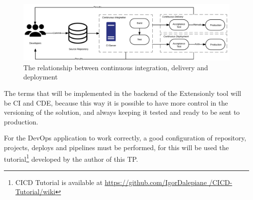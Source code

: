 \begin{figure}[htb]
  \caption{The relationship between continuous integration, delivery and deployment}\label{fig:relationship-ci-cde-cd}
  \begin{center}
    \includegraphics[width=15cm]{img/6-ci-cde-structure.png}
  \end{center}
\end{figure}

The terms that will be implemented in the backend of the Extensionly tool will be \ac{CI} and \ac{CDE}, because this way it is possible to have more control in the versioning of the solution, and always keeping it tested and ready to be sent to production.

For the \ac{DevOps} application to work correctly, a good configuration of repository, projects, deploys and pipelines must be performed, for this will be used the tutorial\footnote{CICD Tutorial is available at \url{https://github.com/IgorDalepiane /CICD-Tutorial/wiki}} developed by the author of this \ac{TP}.


